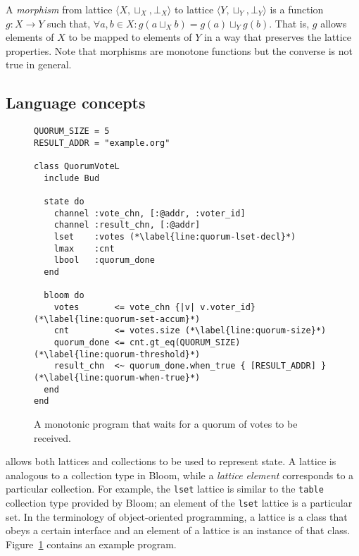 A \emph{morphism} from lattice $\langle X, \sqcup_X, \bot_X\rangle$ to lattice
$\langle Y, \sqcup_Y, \bot_Y\rangle$ is a function $g: X \to Y$ such that,
$\forall a,b \in X: g(a \sqcup_X b) = g(a) \sqcup_Y g(b)$. That is, $g$ allows
elements of $X$ to be mapped to elements of $Y$ in a way that preserves the
lattice properties.  Note that morphisms are monotone functions but the converse
is not true in general.

\subsection{Language concepts}
\begin{figure}[t]
\begin{scriptsize}
\begin{lstlisting}
QUORUM_SIZE = 5
RESULT_ADDR = "example.org"

class QuorumVoteL
  include Bud

  state do
    channel :vote_chn, [:@addr, :voter_id]
    channel :result_chn, [:@addr]
    lset    :votes (*\label{line:quorum-lset-decl}*)
    lmax    :cnt
    lbool   :quorum_done
  end

  bloom do
    votes       <= vote_chn {|v| v.voter_id} (*\label{line:quorum-set-accum}*)
    cnt         <= votes.size (*\label{line:quorum-size}*)
    quorum_done <= cnt.gt_eq(QUORUM_SIZE) (*\label{line:quorum-threshold}*)
    result_chn  <~ quorum_done.when_true { [RESULT_ADDR] } (*\label{line:quorum-when-true}*)
  end
end
\end{lstlisting}
\end{scriptsize}
\caption{A monotonic \lang program that waits for a quorum of votes to be received.}
\label{fig:lattice-quorum}
\end{figure}

\lang allows both lattices and collections to be used to represent state. A
lattice is analogous to a collection type in Bloom, while a \emph{lattice
  element} corresponds to a particular collection. For example, the
\texttt{lset} lattice is similar to the \texttt{table} collection type provided
by Bloom; an element of the \texttt{lset} lattice is a particular set. In the
terminology of object-oriented programming, a lattice is a class that obeys a
certain interface and an element of a lattice is an instance of that
class. Figure~\ref{fig:lattice-quorum} contains an example \lang program.

